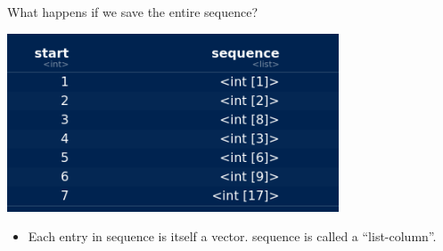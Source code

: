 \documentclass[
  ignorenonframetext,
]{beamer}
\newenvironment{Shaded}{\begin{snugshade}}{\end{snugshade}}
\newcommand{\DataTypeTok}[1]{\textcolor[rgb]{0.13,0.29,0.53}{#1}}
\newcommand{\DecValTok}[1]{\textcolor[rgb]{0.00,0.00,0.81}{#1}}
\newcommand{\KeywordTok}[1]{\textcolor[rgb]{0.13,0.29,0.53}{\textbf{#1}}}
\newcommand{\NormalTok}[1]{#1}
\newcommand{\OperatorTok}[1]{\textcolor[rgb]{0.81,0.36,0.00}{\textbf{#1}}}
\newcommand{\StringTok}[1]{\textcolor[rgb]{0.31,0.60,0.02}{#1}}
\providecommand{\tightlist}{%
  \setlength{\itemsep}{0pt}\setlength{\parskip}{0pt}}
\begin{document}
\begin{frame}[fragile]{What happens if we save the entire sequence?}
\protect\hypertarget{what-happens-if-we-save-the-entire-sequence}{}

\begin{Shaded}
\end{Shaded}

\includegraphics[width=\textwidth,height=2.08333in]{Screenshot_2019-05-07_13-45-12.png}

\begin{itemize}
\tightlist
\item
  Each entry in sequence is itself a vector. sequence is called a
  ``list-column''.
\end{itemize}

\end{frame}
\end{document}
